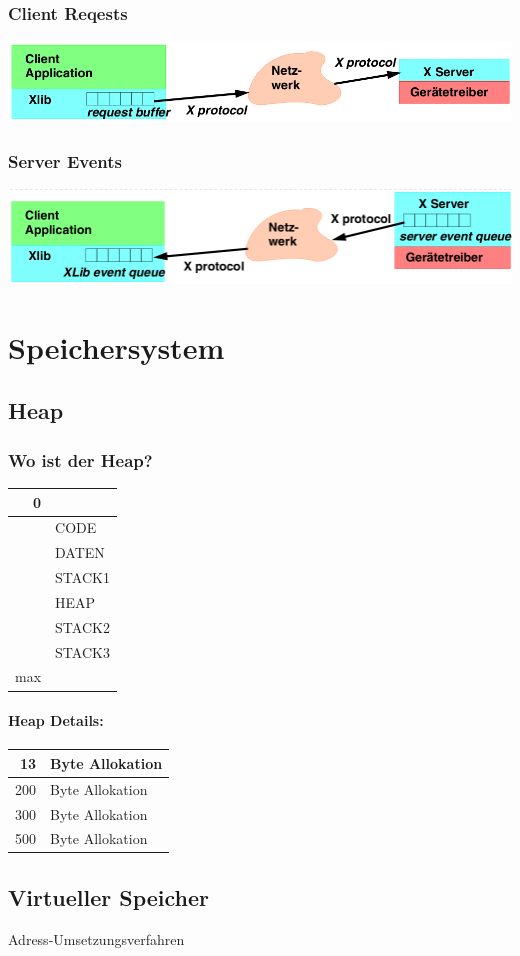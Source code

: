 \subsubsection{Client Reqests}
\includegraphics[width=\linewidth]{img/x_client_request.png}

\subsubsection{Server Events}
\includegraphics[width=\linewidth]{img/x_server_event.png}

\section{Speichersystem}

\subsection{Heap}

\subsubsection{Wo ist der Heap?}

\begin{tabular}{| r | l |}
\hline
0 & \\
\hline
& CODE\\
\hline
& DATEN\\
\hline
& STACK1\\
\hline
& HEAP\\
\hline
& STACK2\\
\hline
& STACK3\\
\hline
max & \\
\hline
\end{tabular}

\paragraph{Heap Details:}

\begin{tabular}{ | r | l |}
\hline
13 & Byte Allokation \\
\hline
200 & Byte Allokation \\
\hline
300 & Byte Allokation \\
\hline
500 & Byte Allokation \\
\hline
\end{tabular}

\subsection{Virtueller Speicher}

Adress-Umsetzungsverfahren



